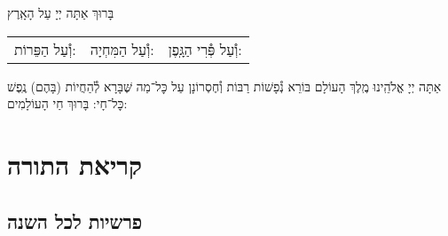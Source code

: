 \documentclass[twoside, openany, parskip=half, 11pt]{book}
\begin{document}
בָּרוּךְ אַתָּה יְיָ עַל הָאָֽרֶץ

\begin{tabular}{c|c|c}
וְ֯עַל הַפֵּרוֹת: & וְ֯עַל הַמִּחְיָה: & וְ֯עַל פְּ֯רִי הַגָּֽפֶן:
\end{tabular}
\medskip

\sepline

\vspace{\baselineskip}

אַתָּה יְיָ אֱלֹהֵֽינוּ מֶֽלֶךְ הָעוֹלָם בּוֹרֵא נְ֯פָשׁוֹת רַבּוֹת וְ֯חֶסְרוֹנָן
עַל כׇּל־מַה שֶּׁבָּרָא לְ֯הַחֲיוֹת (בָּהֶם) נֶֽפֶשׁ כׇּל־חָי: בָּרוּךְ חַי הָעוֹלָמִים:

\chapter[קריאת התורה]{ קריאת התורה }
\label{torah}

\section{פרשיות לכל השנה}
\end{document}
